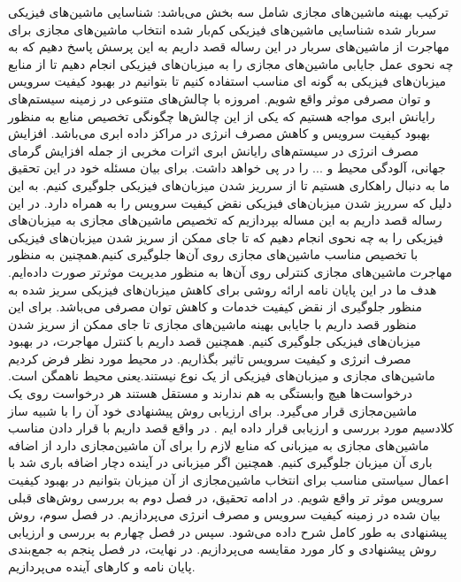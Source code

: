  ترکیب بهینه ماشین‌های مجازی شامل سه بخش می‌باشد:
 شناسایی ماشین‌های فیزیکی سربار شده  
 شناسایی ماشین‌های فیزیکی کم‌بار شده
 انتخاب ماشین‌های مجازی برای مهاجرت از ماشین‌های سربار
   در این رساله قصد داریم به این پرسش پاسخ دهیم که به چه نحوی عمل جایابی ماشین‌های مجازی را به میزبان‌های فیزیکی انجام دهیم تا از منابع میزبان‌های فیزیکی به گونه ای مناسب استفاده کنیم تا بتوانیم در بهبود کیفیت سرویس و توان مصرفی موثر واقع شویم.
 امروزه با چالش‌های متنوعی در زمینه سیستم‌های رایانش ابری مواجه هستیم که یکی از این چالش‌ها چگونگی تخصیص منابع به منظور بهبود کیفیت سرویس و کاهش مصرف انرژی در  مراکز داده ابری می‌باشد. افزایش مصرف انرژی در سیستم‌های رایانش ابری اثرات مخربی از جمله  افزایش گرمای جهانی، آلودگی محیط و ... را در پی خواهد داشت.  برای بیان مسئله خود در این تحقیق ما به دنبال راهکاری هستیم تا از سرریز شدن میزبان‌های فیزیکی جلوگیری کنیم. به این دلیل که سرریز شدن میزبان‌های فیزیکی نقض کیفیت سرویس را به همراه دارد. در این رساله قصد داریم به این مساله بپردازیم که تخصیص ماشین‌های مجازی به میزبان‌های فیزیکی را به چه نحوی انجام دهیم که تا جای ممکن از سریز شدن میزبان‌های فیزیکی با تخصیص مناسب ماشین‌های مجازی روی آن‌ها جلوگیری کنیم.همچنین به منظور مهاجرت ماشین‌های مجازی کنترلی روی آن‌ها به منظور مدیریت موثرتر صورت داده‌ایم.
  هدف ما در این پایان نامه ارائه روشی برای کاهش میزبان‌های فیزیکی سریز شده به منظور جلوگیری از نقض کیفیت خدمات و کاهش توان مصرفی می‌باشد. برای این منظور قصد داریم  با جایابی بهینه ماشین‌های مجازی تا جای ممکن از سریز شدن میزبان‌های فیزیکی جلوگیری کنیم. همچنین قصد داریم با کنترل مهاجرت، در بهبود مصرف انرژی و کیفیت سرویس تاثیر بگذاریم. 
  در محیط مورد نظر فرض کردیم ماشین‌های مجازی و میزبان‌های فیزیکی از یک نوع نیستند.یعنی محیط ناهمگن است.
  درخواست‌ها هیچ وابستگی به هم ندارند و مستقل هستند
  هر درخواست روی یک ماشین‌مجازی قرار می‌گیرد.
 برای ارزیابی روش پیشنهادی خود آن را با شبیه ساز کلادسیم مورد بررسی و ارزیابی قرار داده ایم .
   در واقع قصد داریم با قرار دادن مناسب ماشین‌های مجازی به میزبانی که منابع لازم را برای آن ماشین‌مجازی دارد از اضافه باری آن میزبان جلوگیری کنیم. همچنین اگر میزبانی در آینده دچار اضافه باری شد با اعمال سیاستی مناسب برای انتخاب ماشین‌مجازی از آن میزبان بتوانیم در بهبود کیفیت سرویس موثر تر واقع شویم.
   در ادامه تحقیق، در فصل دوم به بررسی روش‌های قبلی بیان شده در زمینه کیفیت سرویس و مصرف انرژی می‌پردازیم. در فصل سوم، روش پیشنهادی به طور کامل شرح داده می‌شود. سپس در فصل چهارم به بررسی و ارزیابی روش پیشنهادی و کار مورد مقایسه می‌پردازیم. در نهایت، در فصل پنجم به جمع‌­بندی پایان نامه و کارهای آینده می‌پردازیم.
   




